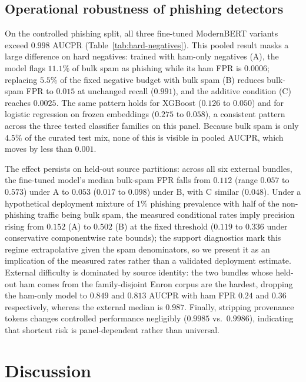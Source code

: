 \documentclass{jmlr}
\begin{document}
\subsection{Operational robustness of phishing detectors}
\label{sec:extension-phishing}



\noindent On the controlled phishing split, all three fine-tuned ModernBERT variants exceed $0.998$ AUCPR (Table~\ref{tab:hard-negatives}). This pooled result masks a large difference on hard negatives: trained with ham-only negatives (A), the model flags $11.1\%$ of bulk spam as phishing while its ham FPR is $0.0006$; replacing $5.5\%$ of the fixed negative budget with bulk spam (B) reduces bulk-spam FPR to $0.015$ at unchanged recall ($0.991$), and the additive condition (C) reaches $0.0025$. The same pattern holds for XGBoost ($0.126$ to $0.050$) and for logistic regression on frozen embeddings ($0.275$ to $0.058$), a consistent pattern across the three tested classifier families on this panel. Because bulk spam is only $4.5\%$ of the curated test mix, none of this is visible in pooled AUCPR, which moves by less than $0.001$.

The effect persists on held-out source partitions: across all six external bundles, the fine-tuned model's median bulk-spam FPR falls from $0.112$ (range $0.057$ to $0.573$) under A to $0.053$ ($0.017$ to $0.098$) under B, with C similar ($0.048$). Under a hypothetical deployment mixture of $1\%$ phishing prevalence with half of the non-phishing traffic being bulk spam, the measured conditional rates imply precision rising from $0.152$ (A) to $0.502$ (B) at the fixed threshold ($0.119$ to $0.336$ under conservative componentwise rate bounds); the support diagnostics mark this regime extrapolative given the spam denominators, so we present it as an implication of the measured rates rather than a validated deployment estimate. External difficulty is dominated by source identity: the two bundles whose held-out ham comes from the family-disjoint Enron corpus are the hardest, dropping the ham-only model to $0.849$ and $0.813$ AUCPR with ham FPR $0.24$ and $0.36$ respectively, whereas the external median is $0.987$. Finally, stripping provenance tokens changes controlled performance negligibly ($0.9985$ vs.\ $0.9986$), indicating that shortcut risk is panel-dependent rather than universal.

\section{Discussion}
\label{sec:discussion}
\end{document}
